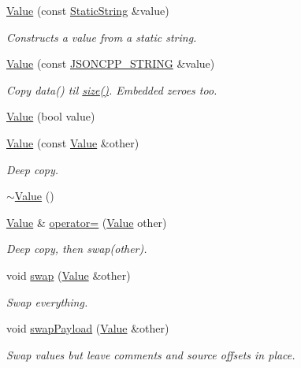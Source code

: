 \begin{DoxyCompactItemize}
\hyperlink{classJson_1_1Value_a081830e95f88a37054da7e46c65b0766}{Value} (const \hyperlink{classJson_1_1StaticString}{Static\+String} \&value)
\begin{DoxyCompactList}\small\item\em Constructs a value from a static string. \end{DoxyCompactList}\item 
\hyperlink{classJson_1_1Value_a89ef37969ff7c6eb3a7afcca03d4cd4a}{Value} (const \hyperlink{json_8hpp_a1e723f95759de062585bc4a8fd3fa4be}{J\+S\+O\+N\+C\+P\+P\+\_\+\+S\+T\+R\+I\+NG} \&value)
\begin{DoxyCompactList}\small\item\em Copy data() til \hyperlink{classJson_1_1Value_a4ca8ee6c48a34ca6c2f131956bab5e05}{size()}. Embedded zeroes too. \end{DoxyCompactList}\item 
\hyperlink{classJson_1_1Value_a350a31ea4a30d384994b0bc010b17495}{Value} (bool value)
\item 
\hyperlink{classJson_1_1Value_a436dfd3670f95fd665f680eba5cebcf0}{Value} (const \hyperlink{classJson_1_1Value}{Value} \&other)
\begin{DoxyCompactList}\small\item\em Deep copy. \end{DoxyCompactList}\item 
\hyperlink{classJson_1_1Value_a287dea48da3912d02756735bf677b27b}{$\sim$\+Value} ()
\item 
\hyperlink{classJson_1_1Value}{Value} \& \hyperlink{classJson_1_1Value_a795acb28772da4c5d85ae8f4af36c69f}{operator=} (\hyperlink{classJson_1_1Value}{Value} other)
\begin{DoxyCompactList}\small\item\em Deep copy, then swap(other). \end{DoxyCompactList}\item 
void \hyperlink{classJson_1_1Value_aab841120d78e296e1bc06a373345e822}{swap} (\hyperlink{classJson_1_1Value}{Value} \&other)
\begin{DoxyCompactList}\small\item\em Swap everything. \end{DoxyCompactList}\item 
void \hyperlink{classJson_1_1Value_a5263476047f20e2fc6de470e4de34fe5}{swap\+Payload} (\hyperlink{classJson_1_1Value}{Value} \&other)
\begin{DoxyCompactList}\small\item\em Swap values but leave comments and source offsets in place. \end{DoxyCompactList}\item 

\end{DoxyCompactItemize}
